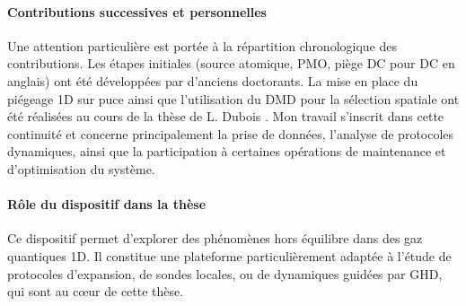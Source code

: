 \paragraph{Contributions successives et personnelles}  
Une attention particulière est portée à la répartition chronologique des contributions. Les étapes initiales (source atomique, \gls{PMO}, piège \acrshort{DC} pour \acrlong{DC} en anglais) ont été développées par d’anciens doctorants. La mise en place du piégeage 1D sur puce ainsi que l’utilisation du \gls{DMD} pour la sélection spatiale ont été réalisées au cours de la thèse de L. Dubois \cite{L.Dubois2024}. Mon travail s’inscrit dans cette continuité et concerne principalement la prise de données, l’analyse de protocoles dynamiques, ainsi que la participation à certaines opérations de maintenance et d’optimisation du système.

\paragraph{Rôle du dispositif dans la thèse}  
Ce dispositif permet d’explorer des phénomènes hors équilibre dans des gaz quantiques 1D. Il constitue une plateforme particulièrement adaptée à l’étude de protocoles d’expansion, de sondes locales, ou de dynamiques guidées par \gls{GHD}, qui sont au cœur de cette thèse.




%

